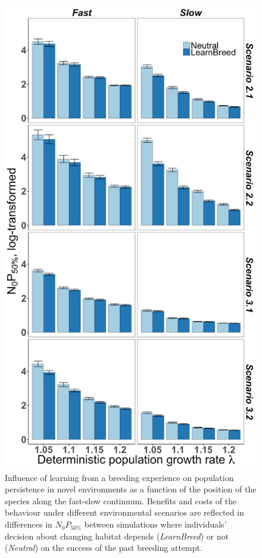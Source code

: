 \begin{figure}
\centering
\includegraphics[height=.75\textheight]{./Figures/Appendix3_2/Fig_9.jpg}
\caption[Effects of \textit{LearnBreed} on $N_{0}P_{50\%}$]{
Influence of learning from a breeding experience on population persistence in
novel environments as a function of the position of the species along the
fast-slow continuum. Benefits and costs of the behaviour under different
environmental scenarios are reflected in differences in $N_{0}P_{50\%}$ between
simulations where individuals’ decision about changing habitat depends
(\emph{LearnBreed}) or not (\emph{Neutral}) on the success of the past breeding
attempt.}
\label{fig:figApp3.2.9}
\end{figure}

